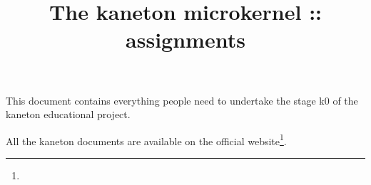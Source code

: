 %
%
%
%
%
%

%
%

%
%

\def\path{../../..}

%
%



%
%


%
%

\title{The kaneton microkernel :: assignments \\
       \version
       \logo}

%
%



%
%

\maketitle

%
%

This document contains everything people need to undertake the stage k0 of
the kaneton educational project.

\-

All the kaneton documents are available on
  the official website\footnote{}.

%
%

\tableofcontents

%
%


%
%





